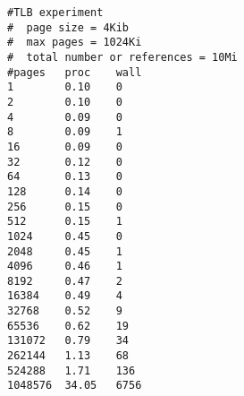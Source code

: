 

\begin{verbatim}
#TLB experiment
#  page size = 4Kib
#  max pages = 1024Ki
#  total number or references = 10Mi
#pages   proc    wall
1        0.10    0
2        0.10    0
4        0.09    0
8        0.09    1
16       0.09    0
32       0.12    0
64       0.13    0
128      0.14    0
256      0.15    0
512      0.15    1
1024     0.45    0
2048     0.45    1
4096     0.46    1
8192     0.47    2
16384    0.49    4
32768    0.52    9
65536    0.62    19
131072   0.79    34
262144   1.13    68
524288   1.71    136
1048576  34.05   6756
\end{verbatim}
